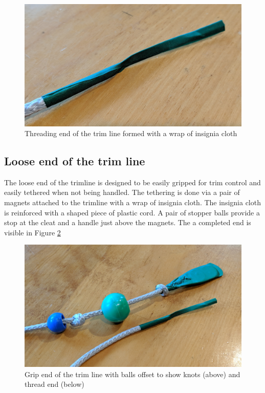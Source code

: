 \documentclass[
]{book}
\begin{document}
\begin{figure}

{\centering \includegraphics[width=0.7\linewidth]{images/thread_end_of_trimline} 

}

\caption{Threading end of the trim line formed with a wrap of insignia cloth}\label{fig:thread-end}
\end{figure}

\hypertarget{loose-end-of-the-trim-line}{%
\subsection{Loose end of the trim line}\label{loose-end-of-the-trim-line}}

The loose end of the trimline is designed to be easily gripped for trim control and easily tethered when not being handled. The tethering is done via a pair of magnets attached to the trimline with a wrap of insignia cloth. The insignia cloth is reinforced with a shaped piece of plastic cord. A pair of stopper balls provide a stop at the cleat and a handle just above the magnets. The a completed end is visible in Figure \ref{fig:finished-end}

\begin{figure}

{\centering \includegraphics[width=0.7\linewidth]{images/finished_end_of_trimline} 

}

\caption{Grip end of the trim line with balls offset to show knots (above) and thread end (below)}\label{fig:finished-end}
\end{figure}
\end{document}
